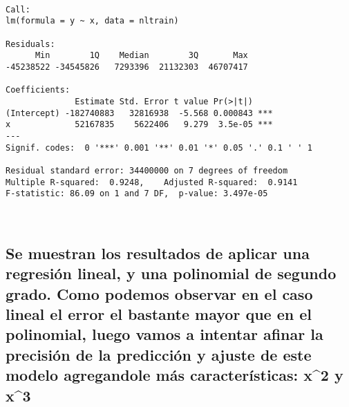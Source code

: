 \documentclass[11pt]{article}
\begin{document}
    
    
    \begin{verbatim}

Call:
lm(formula = y ~ x, data = nltrain)

Residuals:
      Min        1Q    Median        3Q       Max 
-45238522 -34545826   7293396  21132303  46707417 

Coefficients:
              Estimate Std. Error t value Pr(>|t|)    
(Intercept) -182740883   32816938  -5.568 0.000843 ***
x             52167835    5622406   9.279  3.5e-05 ***
---
Signif. codes:  0 '***' 0.001 '**' 0.01 '*' 0.05 '.' 0.1 ' ' 1

Residual standard error: 34400000 on 7 degrees of freedom
Multiple R-squared:  0.9248,	Adjusted R-squared:  0.9141 
F-statistic: 86.09 on 1 and 7 DF,  p-value: 3.497e-05

    \end{verbatim}

    
    \begin{center}
    \end{center}
    { \hspace*{\fill} \\}
    
    \hypertarget{se-muestran-los-resultados-de-aplicar-una-regresiuxf3n-lineal-y-una-polinomial-de-segundo-grado.-como-podemos-observar-en-el-caso-lineal-el-error-el-bastante-mayor-que-en-el-polinomial-luego-vamos-a-intentar-afinar-la-precisiuxf3n-de-la-predicciuxf3n-y-ajuste-de-este-modelo-agregandole-muxe1s-caracteruxedsticas-x2-y-x3}{%
\subsection{Se muestran los resultados de aplicar una regresión lineal,
y una polinomial de segundo grado. Como podemos observar en el caso
lineal el error el bastante mayor que en el polinomial, luego vamos a
intentar afinar la precisión de la predicción y ajuste de este modelo
agregandole más características: x\^{}2 y
x\^{}3}\label{se-muestran-los-resultados-de-aplicar-una-regresiuxf3n-lineal-y-una-polinomial-de-segundo-grado.-como-podemos-observar-en-el-caso-lineal-el-error-el-bastante-mayor-que-en-el-polinomial-luego-vamos-a-intentar-afinar-la-precisiuxf3n-de-la-predicciuxf3n-y-ajuste-de-este-modelo-agregandole-muxe1s-caracteruxedsticas-x2-y-x3}}
\end{document}
